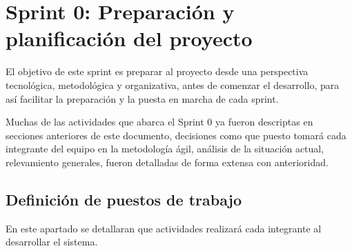 \section{Sprint 0: Preparación y planificación del proyecto}
El objetivo de este sprint es preparar al proyecto desde una perspectiva tecnológica, metodológica y organizativa, antes de comenzar el desarrollo, para así facilitar la preparación y la puesta en marcha de cada sprint.

Muchas de las actividades que abarca el Sprint 0 ya fueron descriptas en secciones anteriores de este documento, decisiones como que puesto tomará cada integrante del equipo en la metodología ágil, análisis de la situación actual, relevamiento generales, fueron detalladas de forma extensa con anterioridad.

\subsection{Definición de puestos de trabajo}
En este apartado se detallaran que actividades realizará cada integrante al desarrollar el sistema.

\begin{table}[h]
\begin{center}
\caption{Equipo de trabajo}
\label{sp0_equipoDeTrabajo}
\end{center}
\end{table}



